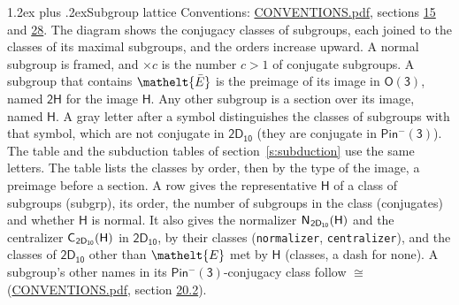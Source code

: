 \documentclass[10pt,a4paper]{article}
\makeatletter
\renewcommand\section{\@startsection{section}{1}{\z@}{-3ex plus -1ex minus -.2ex}%
  {1.2ex plus .2ex}{\normalfont\large\sffamily\bfseries\color{parttitle}}}
\numberwithin{equation}{section}
\newcommand{\eltfont}[1]{{\let\sigma\eltsigma\mathelt{#1}}}
\newcommand{\grp}[1]{\mathsf{#1}}
\newcommand{\cls}[1]{\eltfont{#1}}
\newcommand{\elt}[1]{\eltfont{#1}}
\newcommand{\samecls}{\cong}
\newcommand{\barred}[1]{\bar{#1}}
\newcommand{\hairsp}{\mkern1mu}
\makeatother
\begin{document}
\section{Subgroup lattice}\label{s:subgroups}
Conventions: \href{../../CONVENTIONS.pdf}{CONVENTIONS.pdf}, sections \href{../../../rotation/CONVENTIONS.pdf\#conv.15}{15} and \href{../../CONVENTIONS.pdf\#conv.28}{28}.
The diagram shows the conjugacy classes of subgroups, each joined to the classes of its maximal subgroups, and the orders increase upward. A normal subgroup is framed, and ${\times}c$ is the number $c > 1$ of conjugate subgroups. \label{n:group.H}A subgroup that contains $\elt{\barred{E}}$ is the preimage of its image in $\grp{O(3)}$, named $\grp{2H}$ for the image $\grp{H}$. Any other subgroup is a section over its image, named $\grp{H}$. \label{n:mark.letter}A gray letter after a symbol distinguishes the classes of subgroups with that symbol, which are not conjugate in $\grp{2D_{10}}$ (they are conjugate in \href{Pinminus3.pdf}{$\grp{Pin^{-}(3)}$}). The table and the subduction tables of section~\ref{s:subduction} use the same letters. The table lists the classes by order, then by the type of the image, a preimage before a section. \label{n:head.subgroup}\label{n:head.order}\label{n:head.conjugates}\label{n:head.normal}A row gives the representative $\grp{H}$ of a class of subgroups (subgrp), its order, the number of subgroups in the class (conjugates) and whether $\grp{H}$ is normal. \label{n:group.normalizer}\label{n:group.centralizer}\label{n:head.classes}It also gives the normalizer $\grp{N}_{\hairsp \grp{2D_{10}}}(\grp{H})$ and the centralizer $\grp{C}_{\hairsp \grp{2D_{10}}}(\grp{H})$ in $\grp{2D_{10}}$, by their classes (\texttt{normalizer}, \texttt{centralizer}), and the classes of $\grp{2D_{10}}$ other than $\cls{E}$ met by $\grp{H}$ (classes, a dash for none). A subgroup's other names in its \href{Pinminus3.pdf}{$\grp{Pin^{-}(3)}$}-conjugacy class follow $\samecls$ (\href{../../CONVENTIONS.pdf}{CONVENTIONS.pdf}, section \href{../../CONVENTIONS.pdf\#conv.20.2}{20.2}).
\end{document}

